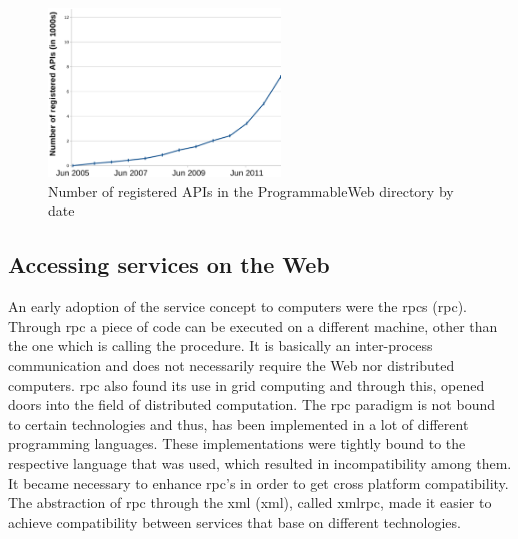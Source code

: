 \begin{figure}[!ht]
  \centering
  \includegraphics[width=0.55\textwidth]{figures/NumOfAPIs}
  \caption{Number of registered APIs in the ProgrammableWeb directory by date}
  \label{fig:NumOfAPIs}
\end{figure}


\subsection{Accessing services on the Web}
An early adoption of the service concept to computers were the \textrm{\acrlong{rpc}s (\acrshort{rpc})}\cite{Birrell:1984:IRP:2080.357392}.
Through \textrm{\acrshort{rpc}} a piece of code can be executed on a different machine, other than the one which is calling the procedure.
It is basically an inter-process communication and does not necessarily require the Web nor distributed computers.
\textrm{\acrshort{rpc}} also found its use in grid computing\cite{seymour2002overview} and through this, opened doors into the field of distributed computation.
The \textrm{\acrshort{rpc}} paradigm is not bound to certain technologies and thus, has been implemented in a lot of different programming languages.
These implementations were tightly bound to the respective language that was used, which resulted in incompatibility among them.
It became necessary to enhance \textrm{\acrshort{rpc}}'s in order to get cross platform compatibility.
The abstraction of \textrm{\acrshort{rpc}} through the \textrm{\acrlong{xml}} (\textrm{\acrshort{xml}})\cite{bray1998extensible}, called \textrm{\acrshort{xmlrpc}}, made it easier to achieve compatibility between services that base on different technologies.


